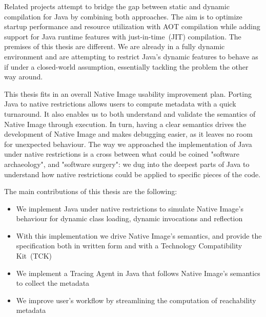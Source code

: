 Related projects attempt to bridge the gap between static and dynamic compilation for Java by combining both approaches. The aim is to optimize startup performance and resource utilization with AOT compilation while adding support for Java runtime features with just-in-time~(JIT) compilation. The premises of this thesis are different. We are already in a fully dynamic environment and are attempting to restrict Java's dynamic features to behave as if under a closed-world assumption, essentially tackling the problem the other way around. 

This thesis fits in an overall Native Image usability improvement plan. Porting Java to native restrictions allows users to compute metadata with a quick turnaround. It also enables us to both understand and validate the semantics of Native Image through execution. In turn, having a clear semantics drives the development of Native Image and makes debugging easier, as it leaves no room for unexpected behaviour.
The way we approached the implementation of Java under native restrictions is a cross between what could be coined "software archaeology", and "software surgery": we dug into the deepest parts of Java to understand how native restrictions could be applied to specific pieces of the code.

The main contributions of this thesis are the following:
\begin{itemize}
  \item We implement Java under native restrictions to simulate Native Image's behaviour for dynamic class loading, dynamic invocations and reflection
  \item With this implementation we drive Native Image's semantics, and provide the specification both in written form and with a Technology Compatibility Kit~(TCK) 
  \item We implement a Tracing Agent in Java that follows Native Image's semantics to collect the metadata 
  \item We improve user's workflow by streamlining the computation of reachability metadata
\end{itemize}